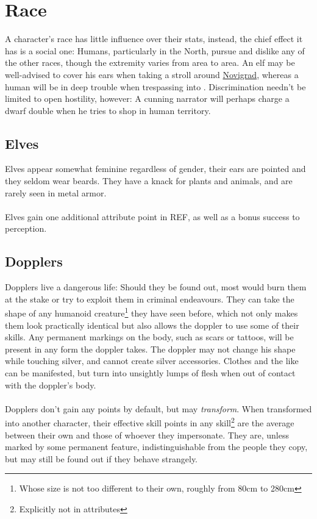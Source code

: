 \documentclass[parskip=full,11pt]{scrreport}
\begin{document}
\section{Race}
A character's race has little influence over their stats, instead, the chief effect it has is a social one: Humans, particularly in the North,
pursue and dislike any of the other races, though the extremity varies from area to area. An elf may be well-advised to cover his ears when
taking a stroll around \hyperref[city:novigrad]{Novigrad}, whereas a human will be in deep trouble when trespassing into .
Discrimination needn't be limited to open hostility, however: A cunning narrator will perhaps charge a dwarf double when he tries to shop in
human territory.

\subsection{Elves}
Elves appear somewhat feminine regardless of gender, their ears are pointed and they seldom
wear beards. They have a knack for plants and animals, and are rarely seen in metal armor.
\\\\
Elves gain one additional attribute point in REF, as well as a bonus success to perception.

\subsection{Dopplers}
Dopplers live a dangerous life: Should they be found out, most would burn them at the stake or try to exploit them in criminal endeavours.
They can take the shape of any humanoid creature\footnote{Whose size is not too different to their own, roughly from 80cm to 280cm} they have seen before, which not only makes them look practically identical but also allows the
doppler to use some of their skills. Any permanent markings on the body, such as scars or tattoos, will be present in any form the doppler takes.
The doppler may not change his shape while touching silver, and cannot create silver accessories. Clothes and the like can be manifested, 
but turn into unsightly lumps of flesh when out of contact with the doppler's body.
\\\\
Dopplers don't gain any points by default, but may \textit{transform}. When transformed into another character, their effective skill points in
any skill\footnote{Explicitly not in attributes} are the average between their own and those of whoever they impersonate. They are, unless marked
by some permanent feature, indistinguishable from the people they copy, but may still be found out if they behave strangely.
\end{document}
